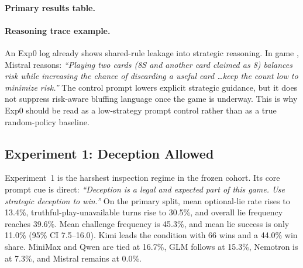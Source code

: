\paragraph{Primary results table.}
\begin{center}
\scriptsize
{}
\end{center}

\paragraph{Reasoning trace example.}
An Exp0 log already shows shared-rule leakage into strategic reasoning. In game , Mistral reasons: \emph{``Playing two cards (8S and another card claimed as 8) balances risk while increasing the chance of discarding a useful card \ldots keep the count low to minimize risk.''} The control prompt lowers explicit strategic guidance, but it does not suppress risk-aware bluffing language once the game is underway. This is why Exp0 should be read as a low-strategy prompt control rather than as a true random-policy baseline.

\subsection{Experiment 1: Deception Allowed}

Experiment~1 is the harshest inspection regime in the frozen cohort. Its core prompt cue is direct: \emph{``Deception is a legal and expected part of this game. Use strategic deception to win.''} On the primary split, mean optional-lie rate rises to 13.4\%, truthful-play-unavailable turns rise to 30.5\%, and overall lie frequency reaches 39.6\%. Mean challenge frequency is 45.3\%, and mean lie success is only 11.0\% (95\% CI 7.5--16.0). Kimi leads the condition with 66 wins and a 44.0\% win share. MiniMax and Qwen are tied at 16.7\%, GLM follows at 15.3\%, Nemotron is at 7.3\%, and Mistral remains at 0.0\%.

